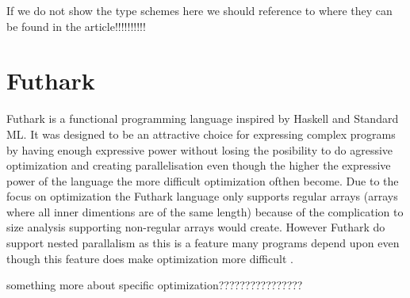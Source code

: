 \documentclass[11pt]{article}
\begin{document}
If we do not show the type schemes here we should reference to where they can be found in the article!!!!!!!!!!




 


\section{Futhark}

Futhark is a functional programming language inspired by Haskell and Standard ML.
It was designed to be an attractive choice for expressing complex programs by having enough expressive power without
losing the posibility to do agressive optimization and creating parallelisation even though the higher the expressive power of the
language the more difficult optimization ofthen become.
Due to the focus on optimization the Futhark language only supports regular arrays (arrays where all inner dimentions are of the same length)
because of the complication to size analysis supporting non-regular arrays would create.
However Futhark do support nested parallalism as this is a feature many programs 
depend upon even though this feature does make optimization more difficult \cite{TroelsHenriksen}.

something more about specific optimization????????????????\\
\end{document}
